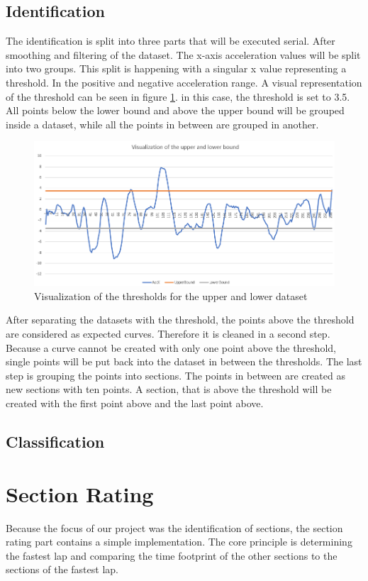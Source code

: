 \subsection{Identification}
The identification is split into three parts that will be executed serial. After smoothing and filtering of the dataset. The x-axis acceleration values will be split into two groups. This split is happening with a singular x value representing a threshold. In the positive and negative acceleration range. A visual representation of the threshold can be seen in figure \ref{upperlowerBound}. in this case, the threshold is set to 3.5. All points below the lower bound and above the upper bound will be grouped inside a dataset, while all the points in between are grouped in another.
\begin{figure}[H]
	\centering
	\includegraphics[scale= 0.6]{Pictures/upperandlowerbound.png}
	\caption{Visualization of the thresholds for the upper and lower dataset}
	\label{upperlowerBound}
\end{figure}
After separating the datasets with the threshold, the points above the threshold are considered as expected curves. Therefore it is cleaned in a second step. Because a curve cannot be created with only one point above the threshold, single points will be put back into the dataset in between the thresholds. The last step is grouping the points into sections. The points in between are created as new sections with ten points. A section, that is above the threshold will be created with the first point above and the last point above.

\subsection{Classification}

\section{Section Rating}
Because the focus of our project was the identification of sections, the section rating part contains a simple implementation. The core principle is determining the fastest lap and comparing the time footprint of the other sections to the sections of the fastest lap.